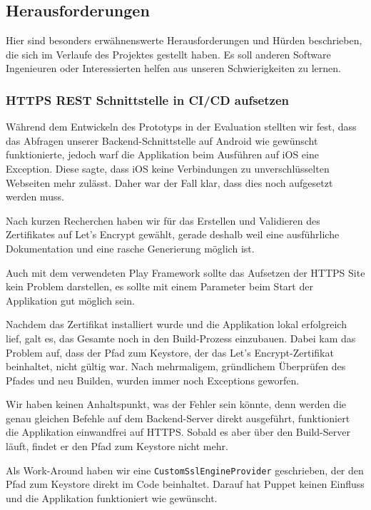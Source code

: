 \subsection{Herausforderungen}
Hier sind besonders erwähnenswerte Herausforderungen und Hürden beschrieben, die sich im Verlaufe des Projektes gestellt haben. Es soll anderen Software Ingenieuren oder Interessierten helfen  aus unseren Schwierigkeiten zu lernen. 

\subsubsection{HTTPS REST Schnittstelle in CI/CD aufsetzen}
Während dem Entwickeln des Prototyps in der Evaluation stellten wir fest, dass das Abfragen unserer Backend-Schnittstelle auf Android wie gewünscht funktionierte, jedoch warf die Applikation beim Ausführen auf iOS eine Exception. Diese sagte, dass iOS keine Verbindungen zu unverschlüsselten Webseiten mehr zulässt. Daher war der Fall klar, dass dies noch aufgesetzt werden muss.

Nach kurzen Recherchen haben wir für das Erstellen und Validieren des Zertifikates auf Let's Encrypt \cite{letsencrypt} gewählt, gerade deshalb weil eine ausführliche Dokumentation und eine rasche Generierung möglich ist. 

Auch mit dem verwendeten Play Framework sollte das Aufsetzen der HTTPS Site kein Problem darstellen, es sollte mit einem Parameter beim Start der Applikation gut möglich sein. 

Nachdem das Zertifikat installiert wurde und die Applikation lokal erfolgreich lief, galt es, das Gesamte noch in den Build-Prozess einzubauen. Dabei kam das Problem auf, dass der Pfad zum Keystore, der das Let's Encrypt-Zertifikat beinhaltet, nicht gültig war. Nach mehrmaligem, gründlichem Überprüfen des Pfades und neu Builden, wurden immer noch Exceptions geworfen.

Wir haben keinen Anhaltspunkt, was der Fehler sein könnte, denn werden die genau gleichen Befehle auf dem Backend-Server direkt ausgeführt, funktioniert die Applikation einwandfrei auf HTTPS. Sobald es aber über den Build-Server läuft, findet er den Pfad zum Keystore nicht mehr.

Als Work-Around haben wir eine \texttt{CustomSslEngineProvider} geschrieben, der den Pfad zum Keystore direkt im Code beinhaltet. Darauf hat Puppet keinen Einfluss und die Applikation funktioniert wie gewünscht.